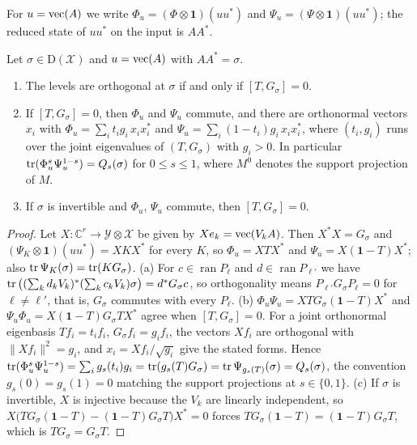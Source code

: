 For $u=\operatorname{vec}(A)$ we write $\Phi_u=(\Phi\otimes\mathbf 1)(uu^*)$ and $\Psi_u=(\Psi\otimes\mathbf 1)(uu^*)$; the reduced state of $uu^*$ on the input is $AA^*$.

\begin{lemma}\label{chn:lem:comm}
Let $\sigma\in\mathrm D(\mathcal X)$ and $u=\operatorname{vec}(A)$ with $AA^*=\sigma$.
\begin{enumerate}
\item[(a)] The levels are orthogonal at $\sigma$ if and only if $[T,G_\sigma]=0$.
\item[(b)] If $[T,G_\sigma]=0$, then $\Phi_u$ and $\Psi_u$ commute, and there are orthonormal vectors $x_i$ with $\Phi_u=\sum_it_ig_i\,x_ix_i^*$ and $\Psi_u=\sum_i(1-t_i)g_i\,x_ix_i^*$, where $(t_i,g_i)$ runs over the joint eigenvalues of $(T,G_\sigma)$ with $g_i>0$. In particular $\operatorname{tr}(\Phi_u^s\Psi_u^{1-s})=Q_s(\sigma)$ for $0\le s\le1$, where $M^0$ denotes the support projection of $M$.
\item[(c)] If $\sigma$ is invertible and $\Phi_u$, $\Psi_u$ commute, then $[T,G_\sigma]=0$.
\end{enumerate}
\end{lemma}

\begin{proof}
Let $X:\mathbb C^r\to\mathcal Y\otimes\mathcal X$ be given by $Xe_k=\operatorname{vec}(V_kA)$. Then $X^*X=G_\sigma$ and $(\Psi_K\otimes\mathbf 1)(uu^*)=XKX^*$ for every $K$, so $\Phi_u=XTX^*$ and $\Psi_u=X(\mathbf 1-T)X^*$; also $\operatorname{tr}\Psi_K(\sigma)=\operatorname{tr}(KG_\sigma)$. (a) For $c\in\operatorname{ran}P_\ell$ and $d\in\operatorname{ran}P_{\ell'}$ we have $\operatorname{tr}\big((\sum_kd_kV_k)^*(\sum_kc_kV_k)\sigma\big)=d^*G_\sigma c$, so orthogonality means $P_{\ell'}G_\sigma P_\ell=0$ for $\ell\ne\ell'$, that is, $G_\sigma$ commutes with every $P_\ell$. (b) $\Phi_u\Psi_u=XTG_\sigma(\mathbf 1-T)X^*$ and $\Psi_u\Phi_u=X(\mathbf 1-T)G_\sigma TX^*$ agree when $[T,G_\sigma]=0$. For a joint orthonormal eigenbasis $Tf_i=t_if_i$, $G_\sigma f_i=g_if_i$, the vectors $Xf_i$ are orthogonal with $\|Xf_i\|^2=g_i$, and $x_i=Xf_i/\sqrt{g_i}$ give the stated forms. Hence $\operatorname{tr}(\Phi_u^s\Psi_u^{1-s})=\sum_ig_s(t_i)g_i=\operatorname{tr}(g_s(T)G_\sigma)=\operatorname{tr}\Psi_{g_s(T)}(\sigma)=Q_s(\sigma)$, the convention $g_s(0)=g_s(1)=0$ matching the support projections at $s\in\{0,1\}$. (c) If $\sigma$ is invertible, $X$ is injective because the $V_k$ are linearly independent, so $X\big(TG_\sigma(\mathbf 1-T)-(\mathbf 1-T)G_\sigma T\big)X^*=0$ forces $TG_\sigma(\mathbf 1-T)=(\mathbf 1-T)G_\sigma T$, which is $TG_\sigma=G_\sigma T$.
\end{proof}

